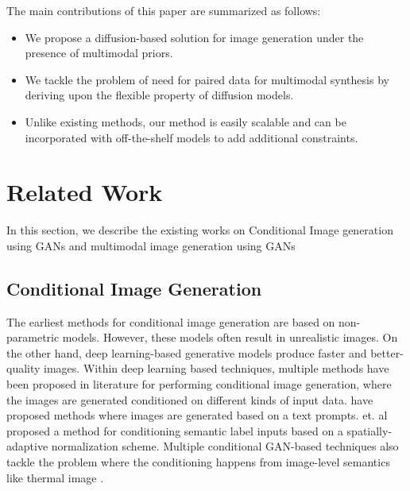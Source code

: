 \documentclass[10pt,twocolumn,letterpaper]{article}
\begin{document}
The main contributions of this paper are summarized as follows:




\begin{itemize}[noitemsep]
    \item  We propose a diffusion-based solution for image generation under the presence of multimodal priors.
    \item We tackle the problem of need for paired data for multimodal synthesis by deriving upon the flexible property of diffusion models.
    \item Unlike existing methods, our method is easily scalable and can be incorporated with off-the-shelf models to add additional constraints.
\end{itemize}


\section{Related Work}
 In this section, we describe the existing works on Conditional Image generation using GANs and multimodal image generation using GANs
 
 \subsection{Conditional Image Generation}
 The earliest methods for conditional image generation are based on non-parametric models\cite{zeng2021np}. However, these models often result in unrealistic images. On the other hand, deep learning-based generative models produce faster and better-quality images. Within deep learning based techniques, multiple methods have been proposed in literature for performing conditional image generation,  where the images are generated conditioned on different kinds of input data. have proposed methods where images are generated based on a text prompts\cite{ramesh2021zero}.  \cite{park2019SPADE} et. al proposed a method for conditioning semantic label inputs based on a spatially-adaptive normalization scheme. \cite{tan2021diverse,oasis} Multiple conditional GAN-based techniques also tackle the problem where the conditioning happens from image-level semantics like thermal image \cite{isola2017image,wang2018pix2pixHD}.
 
\end{document}
